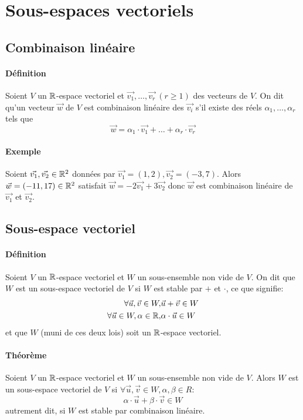 %
%
\section{Sous-espaces vectoriels}
%
%

%
\subsection{Combinaison linéaire}
%
\paragraph{Définition} Soient $V$ un $\mathbb{R}$-espace vectoriel et $\vec{v_1}, \ldots, \vec{v_r} ~ (r\geq 1)$ des vecteurs de $V$. On dit qu'un vecteur $\vec{w}$ de $V$ est combinaison linéaire des $\vec{v_i}$ s'il existe des réels $\alpha_1, \ldots, \alpha_r$ tels que
$$\vec{w} = \alpha_1 \cdot \vec{v_1} + \ldots + \alpha_r \cdot \vec{v_r}$$

\paragraph{Exemple} Soient $\vec{v_1}, \vec{v_2} \in \mathbb{R}^2$ données par $\vec{v_1}=(1,2), \vec{v_2}=(-3,7)$. Alors $\vec{w}=(-11,17) \in \mathbb{R}^2$ satisfait $\vec{w}=-2\vec{v_1}+3\vec{v_2}$ donc $\vec{w}$ est combinaison linéaire de $\vec{v_1}$ et $\vec{v_2}$. %
%
\subsection{Sous-espace vectoriel}
%
\paragraph{Définition} Soient $V$ un $\mathbb{R}$-espace vectoriel et $W$ un sous-ensemble non vide de $V$. On dit que $W$ est un sous-espace vectoriel de $V$ si $W$ est stable par $+$ et $\cdot$, ce que signifie:
\begin{eqnarray*}
  \forall \vec{u}, \vec{v} \in W, & \vec{u} + \vec{v} \in W \\
  \forall \vec{u} \in W, \alpha \in \mathbb{R}, & \alpha \cdot \vec{u} \in W \\
\end{eqnarray*}
et que $W$ (muni de ces deux lois) soit un $\mathbb{R}$-espace vectoriel.

\paragraph{Théorème} Soient $V$ un $\mathbb{R}$-espace vectoriel et $W$ un sous-ensemble non vide de $V$. Alors $W$ est un sous-espace vectoriel de $V$ si $\forall \vec{u}, \vec{v} \in W, \alpha, \beta \in R$:
$$\alpha \cdot \vec{u} + \beta \cdot \vec{v} \in W$$
autrement dit, si $W$ est stable par combinaison linéaire.

